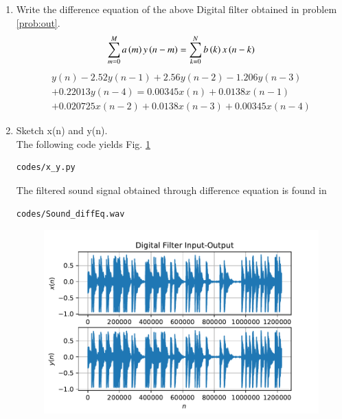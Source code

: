 \documentclass[journal,12pt,twocolumn]{IEEEtran}
\renewcommand\thesection{\arabic{section}}
\begin{document}
\begin{enumerate}[label=\thesection.\arabic*,ref=\thesection.\theenumi]
\item
\label{prob:diffEq}
Write the difference equation of the above Digital filter obtained in problem \ref{prob:out}.
\\
\solution
\begin{equation}
\label{eq:eqn1}
 \sum _{m=0}^{M}a\left(m\right)y\left(n-m\right)=\sum _{k=0}^{N}b\left(k\right)x\left(n-k\right)
\end{equation}
\begin{equation}
\label{eq:eqn2}
\begin{split}
y(n) - 2.52y(n-1) + 2.56y(n-2) - 1.206y(n-3)
\\
+ 0.22013y(n-4) = 0.00345x(n) + 0.0138x(n-1)
\\
+ 0.020725x(n-2) + 0.0138x(n-3) + 0.00345x(n-4)
\end{split}
\end{equation}

\item
\label{prob:plot_x_y}
Sketch x(n) and y(n).
\\
\solution
The following code yields Fig. \ref{fig:x_y}
\begin{lstlisting}
codes/x_y.py
\end{lstlisting}
The filtered sound signal obtained through difference equation is found in
\begin{lstlisting}
codes/Sound_diffEq.wav
\end{lstlisting}
\begin{figure}[!ht]
\begin{center}
\includegraphics[width=\columnwidth]{./figs/x_y}
\end{center}
\label{fig:x_y}	
\end{figure}
\end{enumerate}
\end{document}
